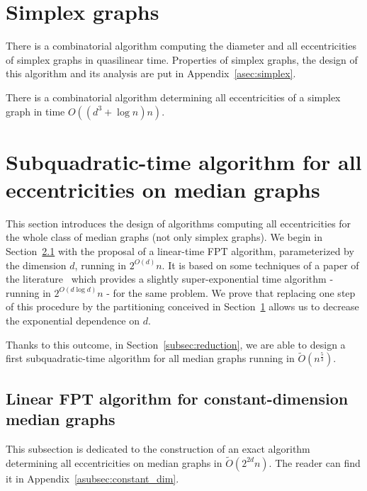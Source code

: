 \documentclass[a4paper,UKenglish,numberwithinsect,cleveref, autoref]{lipics-v2021}
\begin{document}

\section{Simplex graphs} \label{sec:simplex}

There is a combinatorial algorithm computing the diameter and all eccentricities of simplex graphs in quasilinear time. Properties of simplex graphs, the design of this algorithm and its analysis are put in Appendix~\ref{asec:simplex}.

\begin{theorem}[\ref{co:linear_simplex}]
There is a combinatorial algorithm determining all eccentricities of a simplex graph in time $O((d^3+\log n)n)$.
\label{th:linear_simplex_teaser}
\end{theorem}

\section{Subquadratic-time algorithm for all eccentricities on median graphs} \label{sec:subquadratic}

This section introduces the design of algorithms computing all eccentricities for the whole class of  median graphs (not only simplex graphs). We begin in Section~\ref{subsec:constant_dim} with the proposal of a linear-time FPT algorithm, parameterized by the dimension $d$, running in $2^{O(d)}n$. It is based on some techniques of a paper of the literature~\cite{BeHa21} which provides a slightly super-exponential time algorithm - running in $2^{O(d\log d)}n$ - for the same problem. We prove that replacing one step of this procedure by the partitioning conceived in Section~\ref{sec:simplex} allows us to decrease the exponential dependence on $d$.

 Thanks to this outcome, in Section~\ref{subsec:reduction}, we are able to design a first subquadratic-time algorithm for all median graphs running in $\tilde{O}(n^{\frac{5}{3}})$.

\subsection{Linear FPT algorithm for constant-dimension median graphs} \label{subsec:constant_dim}

This subsection is dedicated to the construction of an exact algorithm determining all eccentricities on median graphs in $\tilde{O}(2^{2d}n)$. The reader can find it in Appendix~\ref{asubsec:constant_dim}.
\end{document}
